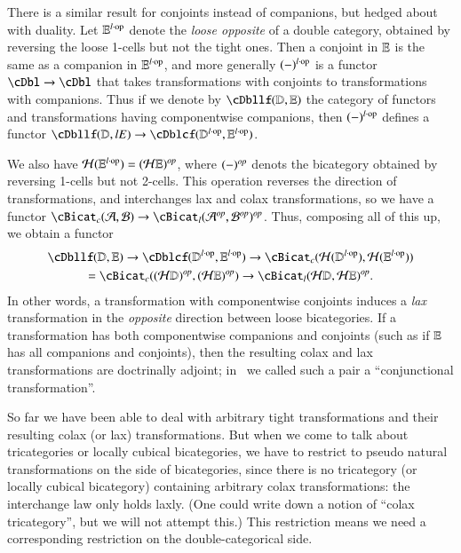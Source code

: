 \begin{rmk}
  There is a similar result for conjoints instead of companions, but hedged about with duality.
  Let $\mathbb{E}^{l\cdot\mathrm{op}}$ denote the \emph{loose opposite} of a double category, obtained by reversing the loose 1-cells but not the tight ones.
  Then a conjoint in $\mathbb{E}$ is the same as a companion in $\mathbb{E}^{l\cdot\mathrm{op}}$, and more generally $(-)^{l\cdot\mathrm{op}}$ is a functor $\cDbl \to \cDbl$ that takes transformations with conjoints to transformations with companions.
  Thus if we denote by $\cDbllf(\lD,\lE)$ the category of functors and transformations having componentwise companions, then $(-)^{l\cdot\mathrm{op}}$ defines a functor $\cDbllf(\lD,lE) \to \cDblcf(\lD\lop,\lE\lop)$.

  We also have $\mathcal{H}(\mathbb{E}^{l\cdot\mathrm{op}}) = (\mathcal{H}\mathbb{E})^{\mathit{op}}$, where $(-)^{\mathit{op}}$ denots the bicategory obtained by reversing 1-cells but not 2-cells.
  This operation reverses the direction of transformations, and interchanges lax and colax transformations, so we have a functor $\cBicat_c(\cA,\cB) \to \cBicat_l(\cA\op,\cB\op)\op$.
  Thus, composing all of this up, we obtain a functor
  \begin{multline*}
    \cDbllf(\lD,\lE) \to \cDblcf(\lD\lop,\lE\lop) \to \cBicat_c(\cH(\lD\lop),\cH(\lE\lop))\\ = \cBicat_c((\cH\lD)\op, (\cH\lE)\op) \to \cBicat_l(\cH\lD, \cH\lE)\op.
  \end{multline*}
  In other words, a transformation with componentwise conjoints induces a \emph{lax} transformation in the \emph{opposite} direction between loose bicategories.
  If a transformation has both componentwise companions and conjoints (such as if $\mathbb{E}$ has all companions and conjoints), then the resulting colax and lax transformations are doctrinally adjoint; in~\cite{shulman:smbicat} we called such a pair a ``conjunctional transformation''.
\end{rmk}

So far we have been able to deal with arbitrary tight transformations and their resulting colax (or lax) transformations.
But when we come to talk about tricategories or locally cubical bicategories, we have to restrict to pseudo natural transformations on the side of bicategories, since there is no tricategory (or locally cubical bicategory) containing arbitrary colax transformations: the interchange law only holds laxly.
(One could write down a notion of ``colax tricategory'', but we will not attempt this.)
This restriction means we need a corresponding restriction on the double-categorical side.


